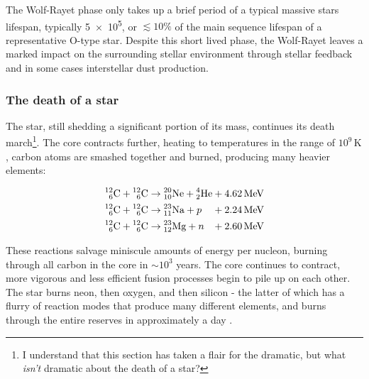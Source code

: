 The Wolf-Rayet phase only takes up a brief period of a typical massive stars lifespan, typically \SI{5e5}{\year}, or $\lesssim 10\%$ of the main sequence lifespan of a representative O-type star.
Despite this short lived phase, the Wolf-Rayet leaves a marked impact on the surrounding stellar environment through stellar feedback and in some cases interstellar dust production.

\subsubsection{The death of a star}

The star, still shedding a significant portion of its mass, continues its death march\footnote{I understand that this section has taken a flair for the dramatic, but what \emph{isn't} dramatic about the death of a star?}.
The core contracts further, heating to temperatures in the range of $10^9 \, \si{\kelvin}$, carbon atoms are smashed together and burned, producing many heavier elements:

\begin{equation}
  \begin{alignedat}{3}
    \atom{C}{12}{6} + \atom{C}{12}{6} & \rightarrow \atom{Ne}{20}{10} + \atom{He}{4}{2} && + \SI{4.62}{\mega\electronvolt} \\
    \atom{C}{12}{6} + \atom{C}{12}{6} & \rightarrow \atom{Na}{23}{11} + p && + \SI{2.24}{\mega\electronvolt} \\
    \atom{C}{12}{6} + \atom{C}{12}{6} & \rightarrow \atom{Mg}{23}{12} + n && + \SI{2.60}{\mega\electronvolt}
  \end{alignedat}
\end{equation}

\noindent
These reactions salvage miniscule amounts of energy per nucleon, burning through all carbon in the core in $\sim 10^3$ years.
The core continues to contract, more vigorous and less efficient fusion processes begin to pile up on each other.
The star burns neon, then oxygen, and then silicon - the latter of which has a flurry of reaction modes that produce many different elements, and burns through the entire reserves in approximately a day
\parencite[Ch.~6]{ryanStellarEvolutionNucleosynthesis2010a}.

